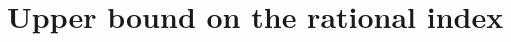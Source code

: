 \documentclass[runningheads]{llncs}
\begin{document}

\section{Upper bound on the rational index} %
\end{document}
